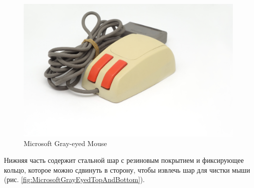 \documentclass[11pt, a4paper]{article}
\begin{document}
\begin{figure}[h]
   \centering
    \includegraphics[scale=0.35]{1985_microsoft_gray_eyed_mouse/pic_red_30.jpg}
    \caption{Microsoft Gray-eyed Mouse}
    \label{fig:MicrosoftGrayEyedRedPic}
\end{figure}

Нижняя часть содержит стальной шар с резиновым покрытием и фиксирующее кольцо, которое можно сдвинуть в сторону, чтобы извлечь шар для чистки мыши (рис. \ref{fig:MicrosoftGrayEyedTopAndBottom}).
\end{document}
